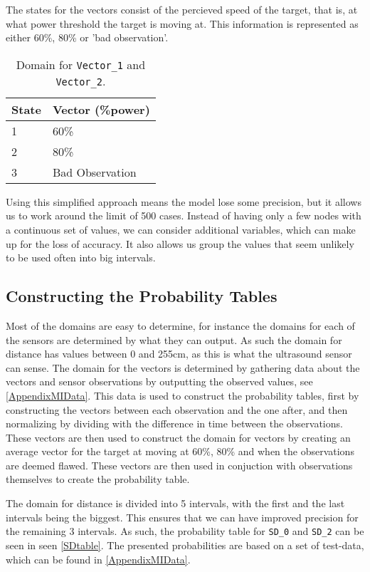 The states for the vectors consist of the percieved speed of the target, that
is, at what power threshold the target is moving at. This information is
represented as either 60\%, 80\% or 'bad observation'.

\begin{table}[H]
\centering
\begin{tabular}{l|l}
State & Vector (\%power) \\ \hline
1     & 60\%             \\
2     & 80\%             \\
3     & Bad Observation
\end{tabular}
\caption{Domain for \texttt{Vector\_1} and \texttt{Vector\_2}.}
\label{vecDom}
\end{table}

Using this simplified approach  means the model lose some precision, but it allows us to
work around the limit of 500 cases. Instead of having only a few nodes with a
continuous set of values, we can consider additional variables, which can
make up for the loss of accuracy. It also allows us group the values
that seem unlikely to be used often into big intervals.


\subsection{Constructing the Probability Tables}

Most of the domains are easy to determine, for instance the domains for each of
the sensors are determined by what they can output. As such the domain for
distance has values between 0 and 255cm, as this is what the ultrasound sensor
can sense. The domain for the vectors is determined by gathering data about the
vectors and sensor observations by outputting the observed values, see
\autoref{AppendixMIData}. This data is used to construct the
probability tables, first by constructing the vectors between each
observation and the one after, and then normalizing by dividing with the
difference in time between the observations. These vectors are then used to
construct the domain for vectors by creating an average vector for the target
at moving at 60\%, 80\% and when the observations are deemed flawed. These
vectors are then used in conjuction with observations themselves to create the
probability table.\nl

The domain for distance is divided into 5 intervals, with the first and the last
intervals being the biggest. This ensures that we can have improved precision
for the remaining 3 intervals. As such, the probability table for \texttt{SD\_0}
and \texttt{SD\_2} can be seen in seen \autoref{SDtable}. The presented
probabilities are based on a set of test-data, which can be found in
\autoref{AppendixMIData}.

